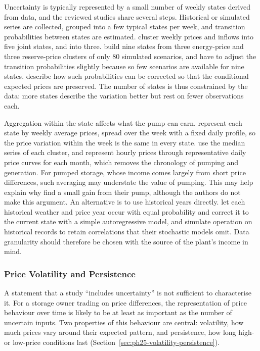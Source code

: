 Uncertainty is typically represented by a small number of weekly states
derived from data, and the reviewed studies share several steps.
Historical or simulated series are collected, grouped into a few typical
states per week, and transition probabilities between states are
estimated. \citet{alic2023optimal} cluster weekly prices and inflows
into five joint states, and \citet{bore2026assessing} into three.
\citet{helseth2016} build nine states from three energy-price and three
reserve-price clusters of only 80 simulated scenarios, and have to adjust
the transition probabilities slightly because so few scenarios are
available for nine states. \citet{mo2001} describe how such probabilities can
be corrected so that the conditional expected prices are preserved. The
number of states is thus constrained by the data: more states describe
the variation better but rest on fewer observations each.

Aggregation within the state affects what the pump can earn.
\citet{alic2023optimal} represent each state by weekly average prices,
spread over the week with a fixed daily profile, so the price variation
within the week is the same in every state. \citet{bore2026assessing}
use the median series of each cluster, and \citet{ak2019quantifying}
represent hourly prices through representative daily price curves for
each month, which removes the chronology of pumping and generation. For
pumped storage, whose income comes largely from short price differences,
such averaging may understate the value of pumping. This may help
explain why \citet{alic2023optimal} find a small gain from their pump,
although the authors do not make this argument. An alternative is to use
historical years directly. \citet{helseth2017} let each historical
weather and price year occur with equal probability and correct it to
the current state with a simple autoregressive model, and
\citet{helseth2013} simulate operation on historical records to retain
correlations that their stochastic models omit. Data granularity should
therefore be chosen with the source of the plant's income in mind.

\subsubsection{Price Volatility and Persistence}
\label{sec:lit_unc_price}

A statement that a study ``includes uncertainty'' is not sufficient to
characterise it. For a storage owner trading on price differences, the
representation of price behaviour over time is likely to be at least as
important as the number of uncertain inputs. Two properties of this
behaviour are central: volatility, how much prices vary around their
expected pattern, and persistence, how long high- or low-price
conditions last (Section~\ref{sec:ph25-volatility-persistence}).

